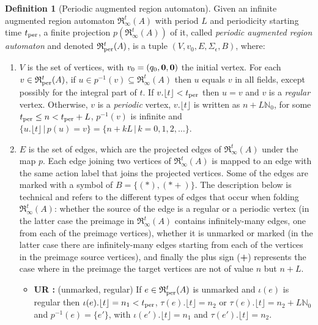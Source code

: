 \documentclass[11pt]{amsart}
\theoremstyle{definition}
\newtheorem{definition}[theorem]{Definition}
\newcommand{\IARRR}{\mathfrak{R}_{\infty}^{t}}
\newcommand{\PARRR}{\mathfrak{R}_\textnormal{per}^{t}}
\newcommand{\eActions}{\Sigma_{\epsilon}}
\newcommand{\ZNaturals}{\mathbb{N}_0}
\begin{document}
\begin{definition}[Periodic augmented region automaton]
	\label{def:per_aug_region_automaton}
	Given an infinite augmented region automaton $\IARRR(A)$ with period $L$ and periodicity starting time $t_\textnormal{per}$, a finite projection $p(\IARRR(A))$ of it, called \emph{periodic augmented region automaton} and denoted $\PARRR(A)$, is a tuple $(V, v_0, E, \eActions, B)$, where:
	\begin{enumerate}
		\item $V$ is the set of vertices, with $v_0 = (q_0, {\bf 0}, {\bf 0})$ the initial vertex.
		For each $v \in \PARRR(A)$, if $u \in p^{-1}(v) \subseteq \IARRR(A)$ then $u$ equals $v$ in all fields, except possibly for the integral part of $t$.
If $v.\lfloor t \rfloor < t_\textnormal{per}$ then $u=v$ and $v$ is a \emph{regular} vertex.
		Otherwise, $v$ is a \emph{periodic} vertex, $v.\lfloor t \rfloor$ is written as $n + L \ZNaturals$, for some $t_\textnormal{per} \leq n < t_\textnormal{per} + L$, $p^{-1}(v)$ is infinite and $\{u.\lfloor t \rfloor \, | \, p(u)=v\} = \{n+kL \, | \, k = 0, 1, 2, \ldots \}$.
\item $E$ is the set of edges, which are the projected edges of $\IARRR(A)$ under the map $p$.
		Each edge joining two vertices of $\IARRR(A)$ is mapped to an edge with the same action label that joins the projected vertices. 
		Some of the edges are marked with a symbol of $B = \{(*),(*+)\}$.
		The description below is technical and refers to the different types of edges that occur when folding $\IARRR(A)$: whether the source of the edge is a regular  or a periodic  vertex (in the latter case the preimage in $\IARRR(A)$ contains infinitely-many edges, one from each of the preimage vertices), whether it is unmarked  or marked  (in the latter case there are infinitely-many edges starting from each of the vertices in the preimage source vertices), and finally the plus sign (\textbf{+}) represents the case where in the preimage the target vertices are not of value $n$ but $n+L$.
\begin{itemize}
			\item \textnormal{\textbf{UR :}} (unmarked, regular) If $e \in \PARRR(A)$ is unmarked and $\iota(e)$ is regular then $\iota(e).\lfloor t \rfloor = n_1 < t_\textnormal{per}$, $\tau(e).\lfloor t \rfloor = n_2$ or   $\tau(e).\lfloor t \rfloor = n_2 + L \ZNaturals$ and $p^{-1}(e)=\{e'\}$, with $\iota(e').\lfloor t \rfloor=n_1$ and $\tau(e').\lfloor t \rfloor=n_2$.

\end{itemize}
\end{enumerate}
\end{definition}
\end{document}
